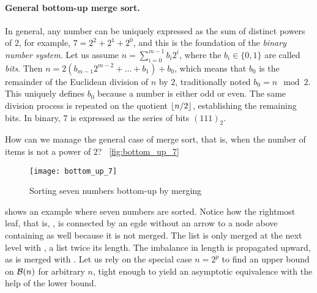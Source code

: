 \medskip

\paragraph{General bottom\hyp{}up merge sort.}

In general, any number can be uniquely expressed as the sum of
distinct powers of \(2\), for example, \(7=2^2+2^1+2^0\), and this is the
foundation of the \emph{binary number system}. Let us assume
\(n=\sum_{i=0}^{m-1}{b_i2^i}\), where the \(b_i \in \{0,1\}\) are
called \emph{bits}. Then \(n = 2(b_{m-1}2^{m-2} + \dots + b_1) +
b_0\), which means that \(b_0\) is the remainder of the Euclidean
division of \(n\) by \(2\), traditionally noted \(b_0 = n \mod
2\). This uniquely defines \(b_0\) because a number is either odd or
even. The same division process is repeated on the quotient
\(\lfloor{n/2}\rfloor\), establishing the remaining bits. In binary, \(7\) is
expressed as the series of bits \((111)_2\).

How can we manage the general case of merge sort, that is, when the
number of items is not a power of \(2\)?  \Fig~\vref{fig:bottom_up_7}
\begin{figure}[b]
\centering
\texttt{[image: bottom\_up\_7]}
\caption{Sorting seven numbers bottom\hyp{}up by merging
\label{fig:bottom_up_7}}
\end{figure}
shows an example where seven numbers are sorted. Notice how the
rightmost leaf, that is, \erlcode{[4]}, is connected by an egde without
an arrow to a node above containing \erlcode{[4]} as well because it
is not merged. The list \erlcode{[4]} is only merged at the next level
with \erlcode{[2,6]}, a list twice its length. The imbalance in length
is propagated upward, as \erlcode{[1,3,5,7]} is merged with
\erlcode{[2,4,6]}. Let us rely on the special case \(n=2^p\) to find
an upper bound on \(\mathcal{B}(n)\) for arbitrary \(n\), tight enough to
yield an asymptotic equivalence with the help of the lower bound.

